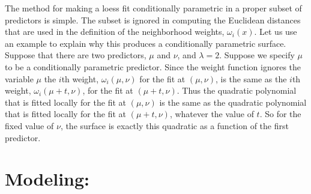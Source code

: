 The method for making a loess fit conditionally parametric in a proper subset of predictors is simple.
The subset is ignored in computing the Euclidean distances that are used in the definition of the
neighborhood weights, $\omega_i(x)$. Let us use an example to explain why this produces a conditionally 
parametric surface. Suppose that there are two predictors, $\mu$ and $\nu$, and $\lambda=2$. Suppose
we specify $\mu$ to be a conditionally parametric predictor. Since the weight function ignores the 
variable $\mu$ the $i$th weight, $\omega_i(\mu, \nu)$ for the fit at $(\mu, \nu)$, is the same as the
$i$th weight, $\omega_i(\mu+t, \nu)$, for the fit at $(\mu+t, \nu)$. Thus the quadratic polynomial 
that is fitted locally for the fit at $(\mu, \nu)$ is the same as the quadratic polynomial that is 
fitted locally for the fit at $(\mu+t, \nu)$, whatever the value of $t$. So for the fixed value
of $\nu$, the surface is exactly this quadratic as a function of the first predictor.

\section{Modeling: }
